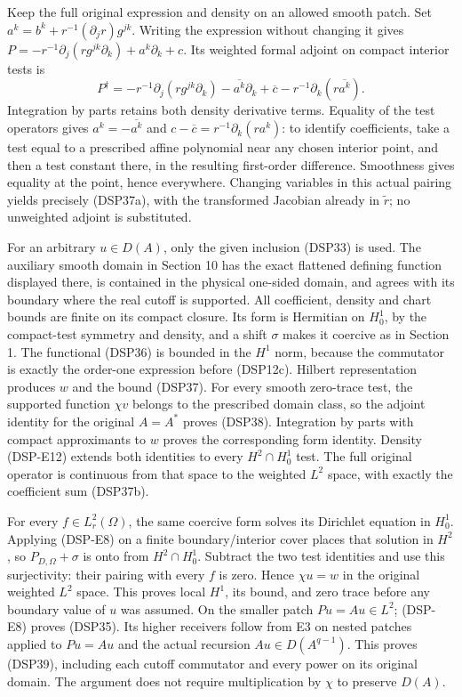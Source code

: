 \documentclass[
  11pt,
]{article}
\begin{document}
Keep the full original expression and density on an allowed smooth
patch. Set \(a^k=b^k+r^{-1}(\partial_jr)g^{jk}\). Writing the expression
without changing it gives
\(P=-r^{-1}\partial_j(rg^{jk}\partial_k)+a^k\partial_k+c\). Its weighted
formal adjoint on compact interior tests is \[
 P^\dagger=-r^{-1}\partial_j(rg^{jk}\partial_k)
 -\overline{a^k}\partial_k
 +\overline c-r^{-1}\partial_k(r\overline{a^k}).
 \tag{DSP-E13}
\] Integration by parts retains both density derivative terms. Equality
of the test operators gives \(a^k=-\overline{a^k}\) and
\(c-\overline c=r^{-1}\partial_k(ra^k)\): to identify coefficients, take
a test equal to a prescribed affine polynomial near any chosen interior
point, and then a test constant there, in the resulting first-order
difference. Smoothness gives equality at the point, hence everywhere.
Changing variables in this actual pairing yields precisely (DSP37a),
with the transformed Jacobian already in \(\widetilde r\); no unweighted
adjoint is substituted.

For an arbitrary \(u\in D(A)\), only the given inclusion (DSP33) is
used. The auxiliary smooth domain in Section 10 has the exact flattened
defining function displayed there, is contained in the physical
one-sided domain, and agrees with its boundary where the real cutoff is
supported. All coefficient, density and chart bounds are finite on its
compact closure. Its form is Hermitian on \(H_0^1\), by the compact-test
symmetry and density, and a shift \(\sigma\) makes it coercive as in
Section 1. The functional (DSP36) is bounded in the \(H^1\) norm,
because the commutator is exactly the order-one expression before
(DSP12c). Hilbert representation produces \(w\) and the bound (DSP37).
For every smooth zero-trace test, the supported function \(\chi v\)
belongs to the prescribed domain class, so the adjoint identity for the
original \(A=A^*\) proves (DSP38). Integration by parts with compact
approximants to \(w\) proves the corresponding form identity. Density
(DSP-E12) extends both identities to every \(H^2\cap H_0^1\) test. The
full original operator is continuous from that space to the weighted
\(L^2\) space, with exactly the coefficient sum (DSP37b).

For every \(f\in L^2_r(\Omega)\), the same coercive form solves its
Dirichlet equation in \(H_0^1\). Applying (DSP-E8) on a finite
boundary/interior cover places that solution in \(H^2\), so
\(P_{D,\Omega}+\sigma\) is onto from \(H^2\cap H_0^1\). Subtract the two
test identities and use this surjectivity: their pairing with every
\(f\) is zero. Hence \(\chi u=w\) in the original weighted \(L^2\)
space. This proves local \(H^1\), its bound, and zero trace before any
boundary value of \(u\) was assumed. On the smaller patch
\(Pu=Au\in L^2\); (DSP-E8) proves (DSP35). Its higher receivers follow
from E3 on nested patches applied to \(Pu=Au\) and the actual recursion
\(Au\in D(A^{q-1})\). This proves (DSP39), including each cutoff
commutator and every power on its original domain. The argument does not
require multiplication by \(\chi\) to preserve \(D(A)\).
\end{document}
